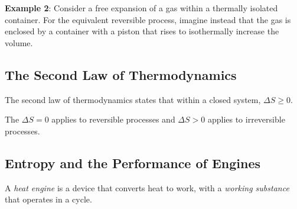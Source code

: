 \documentclass[../PhysicsFormulae.tex]{subfiles}
\begin{document}
\textbf{Example 2}: Consider a free expansion of a gas within a thermally isolated container. For the equivalent reversible process, imagine instead that the gas is enclosed by a container with a piston that rises to isothermally increase the volume. 

\subsection{The Second Law of Thermodynamics}
The second law of thermodynamics states that within a closed system, $\Delta S \geq 0$. \bigskip

The $\Delta S = 0$ applies to reversible processes and $\Delta S > 0$ applies to irreversible processes. 

\subsection{Entropy and the Performance of Engines}
A \textit{heat engine} is a device that converts heat to work, with a \textit{working substance} that operates in a cycle. 
\end{document}
